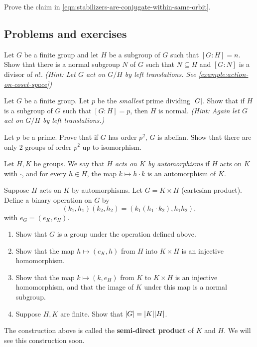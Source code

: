 \documentclass[./main.tex]{subfiles}
\begin{document}
\begin{exercise}
    Prove the claim in \cref{eqn:stabilizers-are-conjugate-within-same-orbit}.
\end{exercise}

\subsection{Problems and exercises}

\begin{exercise}
    Let $G$ be a finite group and let $H$ be a subgroup of $G$ such that $[G:H]
    = n$. Show that there is a normal subgroup $N$ of $G$ such that $N \subseteq
    H$ and $[G:N]$ is a divisor of $n!$. \textit{(Hint: Let $G$ act on $G/H$ by
    left translations. See \cref{example:action-on-coset-space})}
\end{exercise}

\begin{exercise}
    Let $G$ be a finite group. Let $p$ be the \emph{smallest} prime dividing
    $\abs G$. Show that if $H$ is a subgroup of $G$ such that $[G:H] = p$, then
    $H$ is normal. \textit{(Hint: Again let $G$ act on $G/H$ by left
    translations.)}
\end{exercise}

\begin{exercise}
    Let $p$ be a prime. Prove that if $G$ has order $p^2$, $G$ is abelian. Show
    that there are only 2 groups of order $p^2$ up to isomorphism.
\end{exercise}

\begin{exercise}
\label{exercise:semidirect-products}
    Let $H, K$ be groups. We say that \emph{$H$ acts on $K$ by automorphisms} if
    $H$ acts on $K$ with $\cdot$, and for every $h \in H$, the map $k \mapsto h
    \cdot k$ is an automorphism of $K$.

    Suppose $H$ acts on $K$ by automorphisms. Let $G = K \times H$ (cartesian
    product). Define a binary operation on $G$ by
    \[
        (k_1, h_1) (k_2, h_2) = (k_1 (h_1 \cdot k_2), h_1 h_2),
    \]
    with $e_G = (e_K,e_H)$. 

    \begin{enumerate}[label=(\roman*)]
        \item Show that $G$ is a group under the operation defined above.
        \item Show that the map $h \mapsto (e_K, h)$ from $H$ into $K \times H$ is an injective homomorphism.
        \item Show that the map $k \mapsto (k, e_H)$ from $K$ to $K \times H$ is
        an injective homomorphism, and that the image of $K$ under this map is a
        normal subgroup.
        \item Suppose $H, K$ are finite. Show that $\abs G = \abs K \abs H$.
    \end{enumerate}

    The construction above is called the \textbf{semi-direct product} of $K$ and
    $H$. We will see this construction soon.
\end{exercise}
\end{document}
